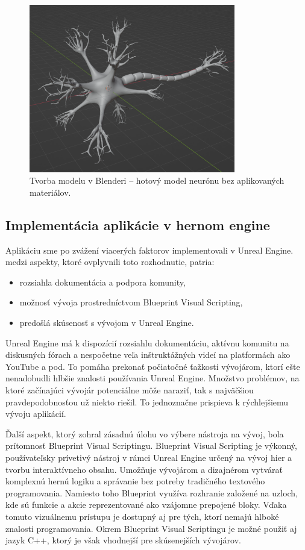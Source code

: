 \begin{figure}[!htbp]
  \centering
  \includegraphics[width=9cm]{img/finalModel-crop.png}
  \caption{Tvorba modelu v Blenderi {--} hotový model neurónu bez aplikovaných materiálov.}
  \label{blender5}
\end{figure}

\subsection{Implementácia aplikácie v hernom engine}\label{gameengine}
Aplikáciu sme po zvážení viacerých faktorov implementovali v Unreal Engine. medzi aspekty, ktoré ovplyvnili toto rozhodnutie, patria:
\begin{itemize}
  \item rozsiahla dokumentácia a podpora komunity,
  \item možnosť vývoja prostredníctvom Blueprint Visual Scripting,
  \item predošlá skúsenosť s vývojom v Unreal Engine.
\end{itemize}

Unreal Engine má k dispozícií rozsiahlu dokumentáciu, aktívnu komunitu na diskusných fórach a nespočetne veľa inštruktážných videí na platformách ako YouTube a pod. To pomáha prekonať počiatočné
ťažkosti vývojárom, ktorí ešte nenadobudli hlbšie znalosti používania Unreal Engine. Množstvo problémov, na ktoré začínajúci vývojár potenciálne môže naraziť, tak s najväčšiou pravdepodobnosťou
už niekto riešil. To jednoznačne prispieva k rýchlejšiemu vývoju aplikácií.

Ďalší aspekt, ktorý zohral zásadnú úlohu vo výbere nástroja na vývoj, bola prítomnosť Blueprint Visual Scriptingu. Blueprint Visual Scripting je výkonný, používateľsky prívetivý nástroj v rámci 
Unreal Engine určený na vývoj hier a tvorbu interaktívneho obsahu. Umožňuje vývojárom a dizajnérom vytvárať komplexnú hernú logiku a správanie bez potreby tradičného textového programovania. Namiesto toho 
Blueprint využíva rozhranie založené na uzloch, kde sú funkcie a akcie reprezentované ako vzájomne prepojené bloky. Vďaka tomuto vizuálnemu prístupu je dostupný aj pre tých, ktorí nemajú hlboké znalosti programovania.
Okrem Blueprint Visual Scriptingu je možné použiť aj jazyk C++, ktorý je však vhodnejší pre skúsenejších vývojárov.

